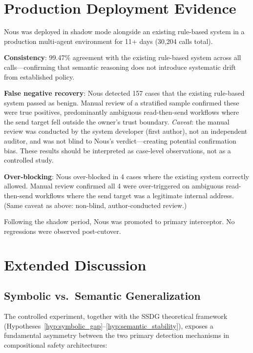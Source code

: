 \documentclass{article}
\theoremstyle{definition}
\begin{document}
\section{Production Deployment Evidence}
\label{app:production}

Nous was deployed in shadow mode alongside an existing rule-based system
in a production multi-agent environment for 11+ days (30,204 calls total).

\textbf{Consistency}: 99.47\% agreement with the existing rule-based
system across all calls---confirming that semantic reasoning does not
introduce systematic drift from established policy.

\textbf{False negative recovery}: Nous detected 157 cases that the
existing rule-based system passed as benign. Manual review of a stratified
sample confirmed these were true positives, predominantly ambiguous
read-then-send workflows where the send target fell outside the owner's
trust boundary. \emph{Caveat}: the manual review was conducted by the
system developer (first author), not an independent auditor, and was not
blind to Nous's verdict---creating potential confirmation bias. These
results should be interpreted as case-level observations, not as a
controlled study.

\textbf{Over-blocking}: Nous over-blocked in 4 cases where the existing
system correctly allowed. Manual review confirmed all 4 were over-triggered
on ambiguous read-then-send workflows where the send target was a legitimate
internal address. (Same caveat as above: non-blind, author-conducted review.)

Following the shadow period, Nous was promoted to primary interceptor.
No regressions were observed post-cutover.

\section{Extended Discussion}
\label{app:extended_discussion}

\subsection{Symbolic vs.\ Semantic Generalization}
\label{app:disc_generalization}

The controlled experiment, together with the SSDG theoretical framework
(Hypotheses~\ref{hyp:symbolic_gap}--\ref{hyp:semantic_stability}),
exposes a fundamental asymmetry between the two
primary detection mechanisms in compositional safety architectures:
\end{document}
